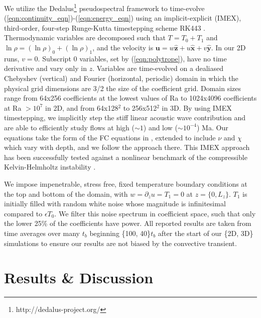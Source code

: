 \documentclass[aps, prl, twocolumn, nofootinbib, groupedaddress, amsfonts, amssymb, amsmath]{revtex4-1}
\begin{document}
We utilize the 
Dedalus\footnote{http://dedalus-project.org/} \cite{burns&all2016} 
pseudospectral framework to time-evolve  
(\ref{eqn:continuity_eqn})-(\ref{eqn:energy_eqn}) 
using an implicit-explicit (IMEX), third-order, four-step 
Runge-Kutta timestepping scheme RK443 \cite{ascher&all1997}.  
Thermodynamic variables are decomposed such that $T = T_0 + T_1$ and
$\ln\rho = (\ln\rho)_0 + (\ln\rho)_1$, 
and the velocity is $\bm{u} = w\bm{\hat{z}} + u\bm{\hat{x}} + v\bm{\hat{y}}$.
In our 2D runs, $v = 0$.
Subscript 0 variables, set by (\ref{eqn:polytrope}), 
have no time derivative and vary only in $z$.
Variables are time-evolved on a dealiased Chebyshev (vertical)
and Fourier (horizontal, periodic) domain in which the
physical grid dimensions are 3/2 the size of the coefficient grid.  
Domain sizes range from
64x256 coefficients at the lowest values of 
Ra to 1024x4096 coefficients at Ra $> 10^{7}$ in 2D,
and from 64x128$^2$ to  256x512$^2$ in 3D. 
By using IMEX timestepping, we implicitly step the 
stiff linear acoustic wave contribution and are able to
efficiently study flows at high ($\sim 1$) 
and low ($\sim 10^{-4}$) Ma.  Our equations take the form
of the FC equations in \cite{lecoanet&all2014}, extended to include
$\nu$ and $\chi$ which vary with depth, and we follow the approach there.
This IMEX approach has been successfully 
tested against a nonlinear benchmark  of the compressible 
Kelvin-Helmholtz instability \cite{Lecoanet_et_al_2016_KH}.

We impose impenetrable, stress free, fixed temperature boundary conditions at
the top and bottom of the domain, with 
$w = \partial_z u = T_1 = 0$ at $z = \{0, L_z\}$. 
$T_1$ is initially filled with
random white noise whose magnitude is infinitesimal
compared to $\epsilon T_0$.
We filter this noise spectrum in coefficient space, 
such that only the lower 25\% of the coefficients
have power. All reported results are taken from time averages
over many $t_b$ beginning \{100, 40\}$t_b$
after the start of our \{2D, 3D\} simulations to
ensure our results are not biased by the convective transient.

\section{Results \& Discussion}
\label{sec:results}
\end{document}
